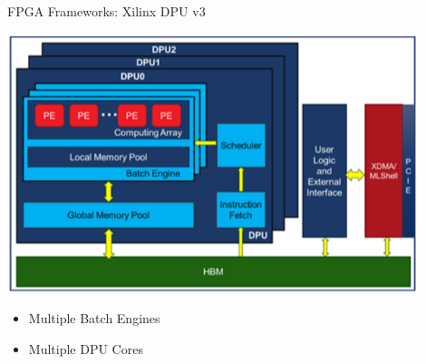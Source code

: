 \begin{frame}{FPGA Frameworks: Xilinx DPU v3}
	\begin{minipage}{0.6\textwidth}
		\centering
		\includegraphics[width=0.9\textwidth]{../Images/Hardware/dpu-v3-architecture.png}\\
	\end{minipage}%
	\begin{minipage}{0.4\textwidth}
		\begin{itemize}
			\item Multiple Batch Engines
			\item Multiple DPU Cores
		\end{itemize}
	\end{minipage}
\end{frame}

